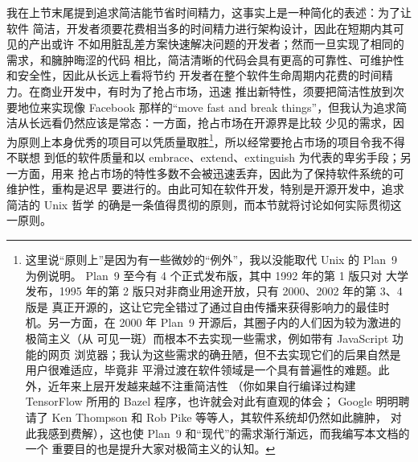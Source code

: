 我在上节末尾提到追求简洁能节省时间精力，这事实上是一种简化的表述：为了让软件
简洁，开发者须要花费相当多的时间精力进行架构设计，因此在短期内其可见的产出或许
不如用脏乱差方案快速解决问题的开发者；然而一旦实现了相同的需求，和臃肿晦涩的代码
相比，简洁清晰的代码会具有更高的可靠性、可维护性和安全性，因此从长远上看将节约
开发者在整个软件生命周期内花费的时间精力。在商业开发中，有时为了抢占市场，迅速
推出新特性，须要把简洁性放到次要地位来实现像 Facebook 那样的“move fast and break
things”，但我认为追求简洁从长远看仍然应该是常态：一方面，抢占市场在开源界是比较
少见的需求，因为原则上本身优秀的项目可以凭质量取胜\footnote{\label{fn:plan9}%
这里说“原则上”是因为有一些微妙的“例外”，我以没能取代 Unix 的 Plan~9 为例说明。%
Plan~9 至今有 4 个正式发布版，其中 1992 年的第 1 版只对
大学发布，1995 年的第 2 版只对非商业用途开放，只有 2000、2002 年的第 3、4 版是
真正开源的，这让它完全错过了通过自由传播来获得影响力的最佳时机。另一方面，在
2000 年 Plan~9 开源后，其圈子内的人们因为较为激进的极简主义（从 \parencite%
{catv:hsoft} 可见一斑）而根本不去实现一些需求，例如带有 JavaScript 功能的网页
浏览器；我认为这些需求的确丑陋，但不去实现它们的后果自然是用户很难适应，毕竟非
平滑过渡在软件领域是一个具有普遍性的难题。此外，近年来上层开发越来越不注重简洁性
（你如果自行编译过构建 TensorFlow 所用的 Bazel 程序，也许就会对此有直观的体会；%
Google 明明聘请了 Ken Thompson 和 Rob Pike 等等人，其软件系统却仍然如此臃肿，
对此我感到费解），这也使 Plan~9 和“现代”的需求渐行渐远，而我编写本文档的一个
重要目的也是提升大家对极简主义的认知。}，所以经常要抢占市场的项目令我不得不联想
到低的软件质量和以 embrace、extend、extinguish 为代表的卑劣手段；另一方面，用来
抢占市场的特性多数不会被迅速丢弃，因此为了保持软件系统的可维护性，重构是迟早
要进行的。由此可知在软件开发，特别是开源开发中，追求简洁的 Unix 哲学
的确是一条值得贯彻的原则，而本节就将讨论如何实际贯彻这一原则。

